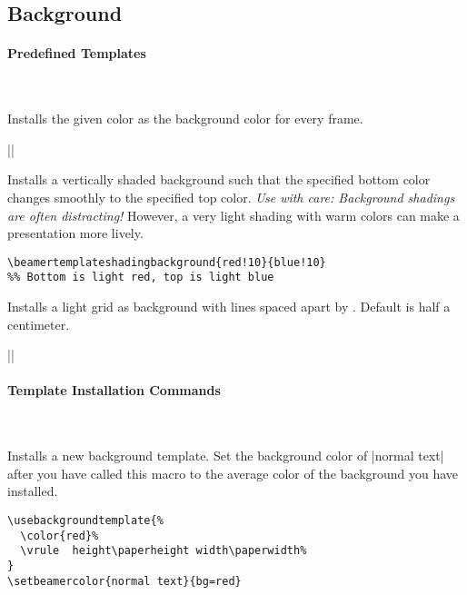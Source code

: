 \subsection{Background}

\label{section-backgrounds}

\paragraph{Predefined Templates}\ 

\begin{command}{\beamertemplatesolidbackgroundcolor{}}
  Installs the given color as the background color for every frame.
  
  \example ||
\end{command}

\begin{command}{\beamertemplateshadingbackground%
    }
  Installs a vertically shaded background such that the
  specified bottom color changes smoothly to the specified top
  color. \emph{Use with care: Background shadings are often
    distracting!} However, a very light shading with warm colors can 
  make a presentation more lively.
  \example
\begin{verbatim}
\beamertemplateshadingbackground{red!10}{blue!10}
%% Bottom is light red, top is light blue
\end{verbatim}
\end{command}


\begin{command}{\beamertemplategridbackground{}}
  Installs a light grid as background with lines spaced apart by
  . Default is half a centimeter.

  \example |\beamertemplategridbackground[0.2cm]|
\end{command}


\paragraph{Template Installation Commands}\ 

\begin{command}{\usebackgroundtemplate{}}
  Installs a new background template. Set the background color of
  |normal text| after you have called this macro to the average color
  of the background you have installed.
  \example
\begin{verbatim}
\usebackgroundtemplate{%
  \color{red}%
  \vrule  height\paperheight width\paperwidth%
}
\setbeamercolor{normal text}{bg=red}
\end{verbatim}
\end{command}








